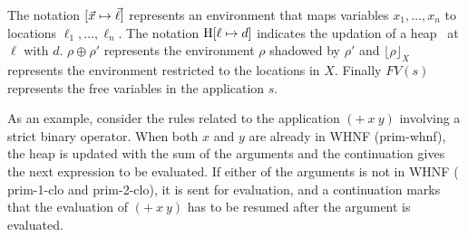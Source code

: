 The  notation $[\myvec{x} \mapsto  \myvec{\ell}]$ represents
an  environment that maps  variables $x_1,  \ldots, x_n$  to locations
$\ell_1,  \ldots,  \ell_n$.   The  notation  $\mbox{H}[\ell  \mapsto  d]$
indicates the  updation of  a heap \heap\  at $\ell$ with  $d$.  $\rho
\oplus \rho'$  represents the  environment $\rho$ shadowed  by $\rho'$
and $\lfloor \rho \rfloor_X$  represents the environment restricted to
the locations in $X$. Finally $FV(s)$ represents the free variables in
the application $s$.

As an example, consider the rules related to the application $(+~x~y)$
involving a strict binary operator.  When both $x$ and $y$ are already
in WHNF  ({\sc prim-whnf}), the  heap is updated  with the sum  of the
arguments  and  the  continuation  gives  the next  expression  to  be
evaluated.   If  either  of  the   arguments  is  not  in  WHNF  ({\sc
  prim-1-clo} and {\sc prim-2-clo}), it  is sent for evaluation, and a
continuation marks that the evaluation  of $(+~x~y)$ has to be resumed
after the argument is evaluated.

